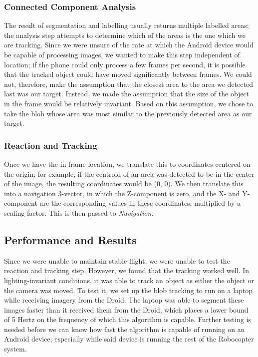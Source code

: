 \subsubsection{Connected Component Analysis}
The result of segmentation and labelling usually returns multiple
labelled areas; the analysis step attempts to determine which of the
areas is the one which we are tracking. Since we were unsure of the
rate at which the Android device would be capable of processing
images, we wanted to make this step independent of location; if the
phone could only process a few frames per second, it is possible that
the tracked object could have moved significantly between frames. We
could not, therefore, make the assumption that the closest area to the
area we detected last was our target. Instead, we made the assumption
that the size of the object in the frame would be relatively
invariant. Based on this assumption, we chose to take the blob whose
area was most similar to the previously detected area as our target.

\subsubsection{Reaction and Tracking}
Once we have the in-frame location, we translate this to coordinates
centered on the origin; for example, if the centroid of an area was
detected to be in the center of the image, the resulting coordinates
would be (0, 0). We then translate this into a navigation 3-vector, in
which the Z-component is zero, and the X- and Y-component are the
corresponding values in these coordinates, multiplied by a scaling
factor. This is then passed to \emph{Navigation}.

\subsection{Performance and Results}
Since we were unable to maintain stable flight, we were unable to test
the reaction and tracking step. However, we found that the tracking
worked well. In lighting-invariant conditions, it was able to track an
object as either the object or the camera was moved. To test it, we
set up the blob tracking to run on a laptop while receiving imagery
from the Droid. The laptop was able to segment these images faster
than it received them from the Droid, which places a lower bound of 5
Hertz on the frequency of which this algorithm is capable. Further
testing is needed before we can know how fast the algorithm is capable
of running on an Android device, especially while said device is
running the rest of the Robocopter system.

